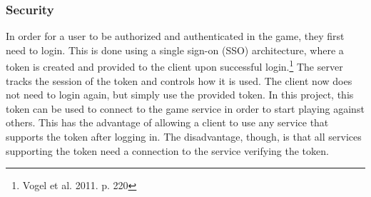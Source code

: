 \subsubsection{Security}
In order for a user to be authorized and authenticated in the game,
they first need to login. This is done using a single sign-on (SSO)
architecture, where a token is created and provided to the client upon
successful login.\footnote{Vogel et al. 2011. p. 220} The server tracks
the session of the token and controls how it is used. The client now does
not need to login again, but simply use the provided token. In this project,
this token can be used to connect to the game service in order to start
 playing against others. This has the advantage of allowing a client to
  use any service that supports the token after logging in. The disadvantage,
   though, is that all services supporting the token need a connection to
   the service verifying the token.
\newpage
